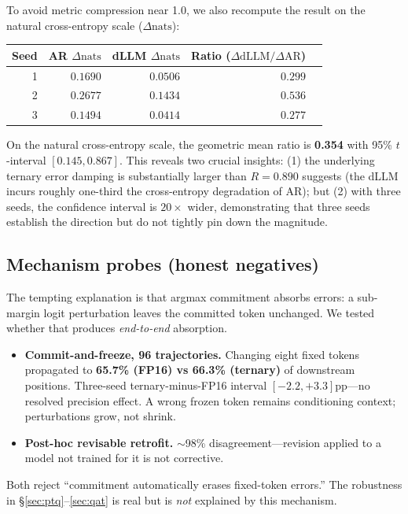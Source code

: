 \documentclass[11pt]{article}
\begin{document}
To avoid metric compression near 1.0, we also recompute the result on the natural cross-entropy scale ($\Delta\text{nats}$):
\begin{center}
\small
\begin{tabular}{rrrrr}
\toprule
Seed & AR $\Delta\text{nats}$ & dLLM $\Delta\text{nats}$ & Ratio ($\Delta\text{dLLM} / \Delta\text{AR}$) \\
\midrule
1 & $0.1690$ & $0.0506$ & $0.299$ \\
2 & $0.2677$ & $0.1434$ & $0.536$ \\
3 & $0.1494$ & $0.0414$ & $0.277$ \\
\bottomrule
\end{tabular}
\end{center}
On the natural cross-entropy scale, the geometric mean ratio is \textbf{0.354} with 95\% $t$-interval $[0.145, 0.867]$. This reveals two crucial insights: (1) the underlying ternary error damping is substantially larger than $R=0.890$ suggests (the dLLM incurs roughly one-third the cross-entropy degradation of AR); but (2) with three seeds, the confidence interval is $20\times$ wider, demonstrating that three seeds establish the direction but do not tightly pin down the magnitude.

\subsection{Mechanism probes (honest negatives)}
\label{sec:mechanism}

The tempting explanation is that argmax commitment absorbs errors: a sub-margin logit perturbation leaves the committed token unchanged. We tested whether that produces \emph{end-to-end} absorption.

\begin{itemize}
\item \textbf{Commit-and-freeze, 96 trajectories.} Changing eight fixed tokens propagated to \textbf{65.7\% (FP16) vs 66.3\% (ternary)} of downstream positions. Three-seed ternary-minus-FP16 interval $[-2.2, +3.3]$pp---no resolved precision effect. A wrong frozen token remains conditioning context; perturbations grow, not shrink.
\item \textbf{Post-hoc revisable retrofit.} $\sim$98\% disagreement---revision applied to a model not trained for it is not corrective.
\end{itemize}

Both reject ``commitment automatically erases fixed-token errors.'' The robustness in \S\ref{sec:ptq}--\ref{sec:qat} is real but is \emph{not} explained by this mechanism.
\end{document}
